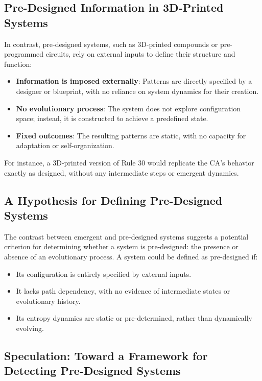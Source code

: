 \documentclass[entropy,article,submit,pdftex,moreauthors]{Definitions/mdpi}
\begin{document}
\subsection{Pre-Designed Information in 3D-Printed Systems}

In contrast, pre-designed systems, such as 3D-printed compounds or pre-programmed circuits, rely on external inputs to define their structure and function:
\begin{itemize}
    \item \textbf{Information is imposed externally}: Patterns are directly specified by a designer or blueprint, with no reliance on system dynamics for their creation.
    \item \textbf{No evolutionary process}: The system does not explore configuration space; instead, it is constructed to achieve a predefined state.
    \item \textbf{Fixed outcomes}: The resulting patterns are static, with no capacity for adaptation or self-organization.
\end{itemize}
For instance, a 3D-printed version of Rule 30 would replicate the CA’s behavior exactly as designed, without any intermediate steps or emergent dynamics.

\subsection{A Hypothesis for Defining Pre-Designed Systems}

The contrast between emergent and pre-designed systems suggests a potential criterion for determining whether a system is pre-designed: the presence or absence of an evolutionary process. A system could be defined as pre-designed if:
\begin{itemize}
    \item Its configuration is entirely specified by external inputs.
    \item It lacks path dependency, with no evidence of intermediate states or evolutionary history.
    \item Its entropy dynamics are static or pre-determined, rather than dynamically evolving.
\end{itemize}

\subsection{Speculation: Toward a Framework for Detecting Pre-Designed Systems}
\end{document}
